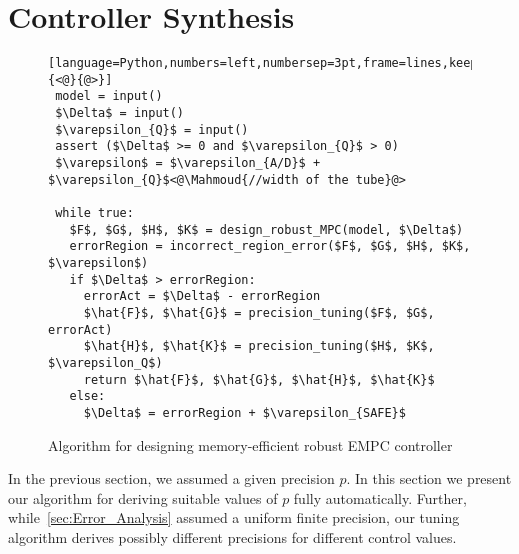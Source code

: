 \section{Controller Synthesis}\label{sec:Controller_Synthesis}

\begin{figure}
\begin{lstlisting}[language=Python,numbers=left,numbersep=3pt,frame=lines,keepspaces=true,mathescape=true,basicstyle=\small\ttfamily,escapeinside={<@}{@>}]
 model = input() 
 $\Delta$ = input()
 $\varepsilon_{Q}$ = input()
 assert ($\Delta$ >= 0 and $\varepsilon_{Q}$ > 0)
 $\varepsilon$ = $\varepsilon_{A/D}$ + $\varepsilon_{Q}$<@\Mahmoud{//width of the tube}@>

 while true:
   $F$, $G$, $H$, $K$ = design_robust_MPC(model, $\Delta$)
   errorRegion = incorrect_region_error($F$, $G$, $H$, $K$, $\varepsilon$)
   if $\Delta$ > errorRegion:
     errorAct = $\Delta$ - errorRegion
     $\hat{F}$, $\hat{G}$ = precision_tuning($F$, $G$, errorAct)
     $\hat{H}$, $\hat{K}$ = precision_tuning($H$, $K$, $\varepsilon_Q$)
     return $\hat{F}$, $\hat{G}$, $\hat{H}$, $\hat{K}$
   else:
     $\Delta$ = errorRegion + $\varepsilon_{SAFE}$
\end{lstlisting}
\caption{Algorithm for designing memory-efficient robust EMPC controller}
\label{lst:alg}
\end{figure}


In the previous section, we assumed a given precision $p$. In this section we
present our algorithm for deriving suitable values of $p$ fully automatically.
Further, while~\autoref{sec:Error_Analysis} assumed a uniform finite precision,
our tuning algorithm derives possibly different precisions for different control
values.

